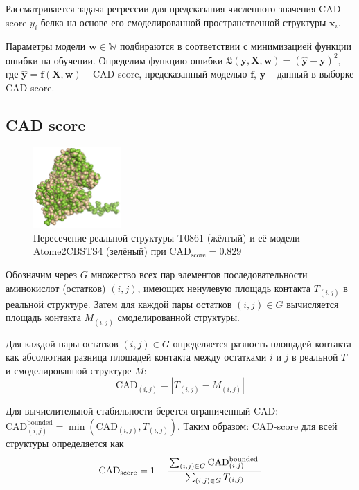 \documentclass[12pt,twosides]{article}
\begin{document}
	Рассматривается задача регрессии для предсказания численного значения CAD-score $y_i$ белка на основе его смоделированной пространственной структуры $\mathbf{x}_i$.
	
	Параметры модели $\mathbf{w}\in \mathbb{W}$ подбираются в соответствии с минимизацией функции ошибки на обучении. Определим функцию ошибки
	$\mathfrak{L}(\mathbf{y}, \mathbf{X}, \mathbf{w}) =\left( \mathbf{\hat{y}} - \mathbf{y} \right)^{2}$, где $\mathbf{\hat{y}} = \mathbf{f} (\mathbf{X},\mathbf{w})$ -- CAD-score, предсказанный моделью $\mathbf{f}$, $\mathbf{y}$ -- данный в выборке CAD-score.
	
	\subsection{CAD score}
	

\begin{figure}
	\centering
	\includegraphics[width=0.3\textwidth]{T0861_Atome2_CBS_TS4.pdf}
	\caption{Пересечение реальной структуры T0861 (жёлтый) и её модели Atome2\textunderscore CBS\textunderscore TS4 (зелёный) при 	$\mathrm{CAD}_\text{score}=0.829$}
	\label{CAD_example}
\end{figure}

	Обозначим через $G$ множество всех пар элементов последовательности аминокислот (остатков)  $(i, j)$, имеющих ненулевую площадь контакта $T_{(i, j)}$ в реальной структуре. Затем для каждой пары остатков $(i, j)\in G$ вычисляется площадь контакта $M_{(i, j)}$ смоделированной структуры. 
	
	

	Для каждой пары остатков $(i, j) \in G$ определяется разность площадей контакта как абсолютная разница площадей контакта между остатками $i$ и $j$ в реальной $T$ и смоделированной структуре $M$:
	$$\mathrm{CAD}_{(i, j)}=\left|T_{(i, j)}-M_{(i, j)}\right|$$
	
	Для вычислительной стабильности берется ограниченный CAD: $\mathrm{CAD}_{(i, j)}^{\text {bounded}}=\min \left(\mathrm{CAD}_{(i, j)}, T_{(i, j)}\right)$. Таким образом:
	CAD-score для всей структуры определяется как
		\begin{align*}
		\mathrm{CAD}_\text{score}=1-\cfrac{\sum_{(i, j) \in G} \mathrm{CAD}_{(i, j)}^{\text {bounded }}}{\sum_{(i, j) \in G} T_{(i, j)}}
		\end{align*}
	
\end{document}
